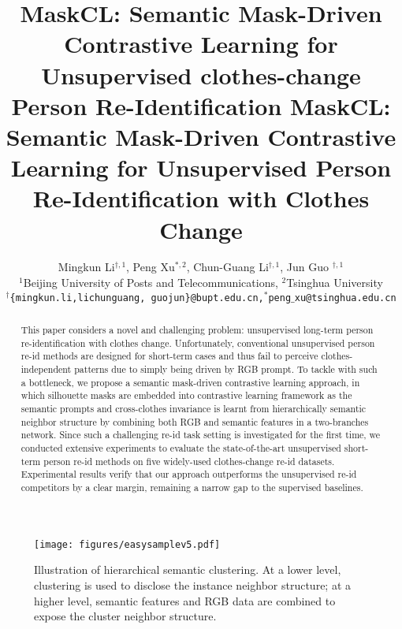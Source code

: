 \documentclass[10pt,twocolumn,letterpaper]{article}
\newcommand{\reid}{re-id}
\newcommand{\sota}{the state-of-the-art}
\begin{document}
\title{ MaskCL: Semantic Mask-Driven Contrastive Learning for Unsupervised clothes-change Person Re-Identification}
\title{ MaskCL: Semantic Mask-Driven Contrastive Learning for Unsupervised Person Re-Identification with Clothes Change}









\author{
    Mingkun Li$^{\dag,1}$, Peng Xu$^{*,2}$, Chun-Guang Li$^{\dag,1}$, Jun Guo $^{\dag,1}$\\
    $^{1}$Beijing University of Posts and Telecommunications,
    $^{2}$Tsinghua University\\
    {\tt\small $^\dag$\{mingkun.li,lichunguang, guojun\}@bupt.edu.cn,$^*$peng$\_$xu@tsinghua.edu.cn}
}
\maketitle
\ificcvfinal\thispagestyle{empty}\fi 


\begin{abstract}






This paper considers a novel and challenging problem: unsupervised long-term person re-identification with clothes change. Unfortunately, conventional unsupervised person re-id methods are designed for short-term cases and thus fail to perceive clothes-independent patterns due to simply being driven by RGB prompt. To tackle with such a bottleneck, we propose a semantic mask-driven contrastive learning approach, in which silhouette masks are embedded into contrastive learning framework as the semantic prompts and cross-clothes invariance is learnt from hierarchically semantic neighbor structure by combining both RGB and semantic features in a two-branches network. 
{Since such a challenging re-id task setting is investigated for the first time, we conducted extensive experiments to evaluate \sota{} unsupervised short-term person re-id methods on five widely-used clothes-change \reid{} datasets.}
Experimental results verify that our approach outperforms the unsupervised \reid{} competitors by a clear margin, remaining a narrow gap to the supervised baselines. 

\end{abstract}






\begin{figure}[t]
\begin{center}
\texttt{[image: figures/easysamplev5.pdf]}
\end{center}
\vspace{-15pt}
   \caption{Illustration of hierarchical semantic clustering. At a lower level, clustering is used to disclose the instance neighbor structure; at a higher level, semantic features and RGB data are combined to expose the cluster neighbor structure.}
\label{fig:semantic_test}
\vspace{-15pt}
\end{figure}
\end{document}
